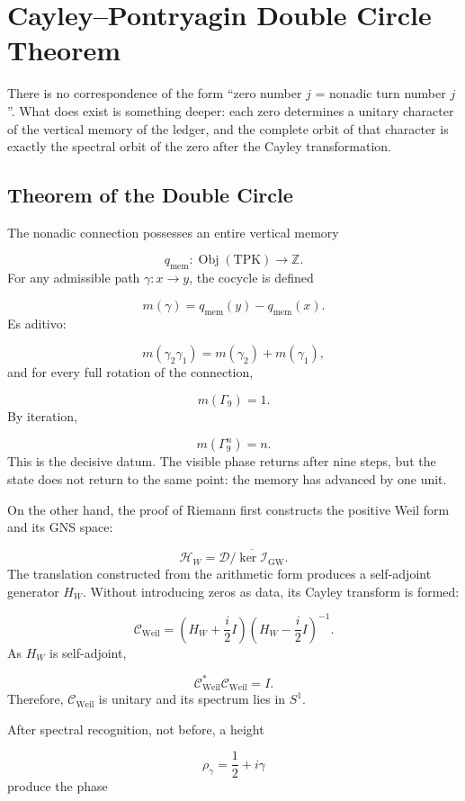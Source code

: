 \section{Cayley–Pontryagin Double Circle Theorem}
There is no correspondence of the form “zero number \(j\) = nonadic turn number \(j\)”. What does exist is something deeper: each zero determines a unitary character of the vertical memory of the ledger, and the complete orbit of that character is exactly the spectral orbit of the zero after the Cayley transformation.\par
{}
\subsection{Theorem of the Double Circle}
The nonadic connection possesses an entire vertical memory\par
\[
q_{\mathrm{mem}}:\operatorname{Obj}(\mathrm{TPK})\longrightarrow\mathbb Z.
\]
For any admissible path \(\gamma:x\to y\), the cocycle is defined\par
\[
m(\gamma)
=
q_{\mathrm{mem}}(y)-q_{\mathrm{mem}}(x).
\]
Es aditivo:\par
\[
m(\gamma_2\gamma_1)
=
m(\gamma_2)+m(\gamma_1),
\]
and for every full rotation of the connection,\par
\[
m(\Gamma_9)=1.
\]
By iteration,\par
\[
m(\Gamma_9^n)=n.
\]
This is the decisive datum. The visible phase returns after nine steps, but the state does not return to the same point: the memory has advanced by one unit.\par
On the other hand, the proof of Riemann first constructs the positive Weil form and its GNS space:\par
\[
\mathcal H_W
=
\overline{\mathcal D/\ker \mathscr I_{\mathrm{GW}}}.
\]
The translation constructed from the arithmetic form produces a self-adjoint generator \(H_W\). Without introducing zeros as data, its Cayley transform is formed:\par
\[
\mathcal C_{\mathrm{Weil}}
=
\left(H_W+\frac{i}{2}I\right)
\left(H_W-\frac{i}{2}I\right)^{-1}.
\]
As \(H_W\) is self-adjoint,\par
\[
\mathcal C_{\mathrm{Weil}}^*
\mathcal C_{\mathrm{Weil}}=I.
\]
Therefore, \(\mathcal C_{\mathrm{Weil}}\) is unitary and its spectrum lies in \(S^1\).\par
After spectral recognition, not before, a height\par
\[
\rho_\gamma=\frac12+i\gamma
\]
produce the phase\par
